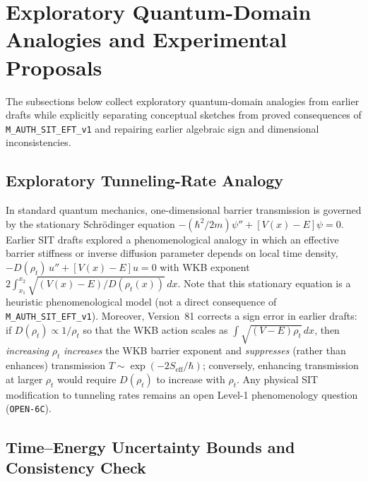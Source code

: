 \section{Exploratory Quantum-Domain Analogies and Experimental Proposals}
\label{sec:applications-predictions}

The subsections below collect exploratory quantum-domain analogies from earlier drafts while explicitly separating conceptual sketches from proved consequences of \texttt{M\_AUTH\_SIT\_EFT\_v1} and repairing earlier algebraic sign and dimensional inconsistencies.

\subsection{Exploratory Tunneling-Rate Analogy}
\label{sec:quantum-tunneling}

In standard quantum mechanics, one-dimensional barrier transmission is governed by the stationary Schr\"odinger equation $-(\hbar^2/2m)\psi'' + [V(x) - E]\psi = 0$. Earlier SIT drafts explored a phenomenological analogy in which an effective barrier stiffness or inverse diffusion parameter depends on local time density, $-D(\rho_t)\,u'' + [V(x)-E]u = 0$ with WKB exponent $2\int_{x_1}^{x_2}\sqrt{(V(x)-E)/D(\rho_t(x))}\,dx$. Note that this stationary equation is a heuristic phenomenological model (not a direct consequence of \texttt{M\_AUTH\_SIT\_EFT\_v1}). Moreover, Version~81 corrects a sign error in earlier drafts: if $D(\rho_t) \propto 1/\rho_t$ so that the WKB action scales as $\int\sqrt{(V-E)\rho_t}\,dx$, then \emph{increasing} $\rho_t$ \emph{increases} the WKB barrier exponent and \emph{suppresses} (rather than enhances) transmission $T \sim \exp(-2S_{\mathrm{eff}}/\hbar)$; conversely, enhancing transmission at larger $\rho_t$ would require $D(\rho_t)$ to increase with $\rho_t$. Any physical SIT modification to tunneling rates remains an open Level-1 phenomenology question (\texttt{OPEN-6C}).

\subsection{Time--Energy Uncertainty Bounds and Consistency Check}
\label{sec:quantum-time-energy}

